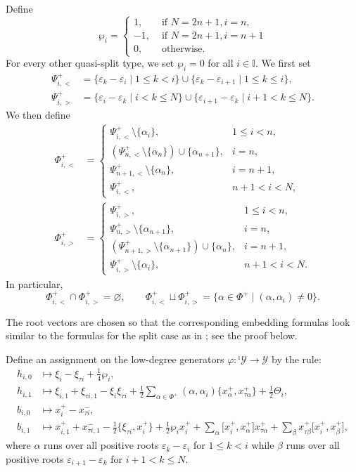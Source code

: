 \documentclass[11pt,reqno]{amsart}
\numberwithin{equation}{section}
\theoremstyle{definition}
\theoremstyle{remark}
\newcommand{\beq}{\begin{equation}}
\newcommand{\eeq}{\end{equation}}
\newcommand{\be}{\begin{equation*}}
\newcommand{\ee}{\end{equation*}}
\newcommand{\hf}{\tfrac12}
\newcommand{\lle}{\leqslant}
\newcommand{\I}{{\mathbb I}}
\newcommand{\ve}{\varepsilon}
\newcommand{\Y}{{\mathscr{Y}}}
\newcommand{\Yi}{{^\imath\mathscr{Y}}}
\newcommand{\comm}[2]{\bigl[#1,#2\bigr]}
\newcommand{\acomm}[2]{\bigl\{#1,#2\bigr\}}
\begin{document}
Define
\beq\label{eq:wpi-def}
\wp_i=\begin{cases}
    1,&\text{ if }N=2n+1,i=n,\\
    -1,&\text{ if }N=2n+1,i=n+1\\
    0,&\text{ otherwise.}
\end{cases}
\eeq
For every other quasi-split type, we set $\wp_i=0$ for all $i\in \I$.
We first set
\[
\begin{split}
\Psi^+_{i,<}&=\{\ve_k-\ve_i\mid 1\lle k<i\}
\cup \{\ve_k-\ve_{i+1}\mid 1\lle k\lle i\},\\
\Psi^+_{i,>}&=\{\ve_i-\ve_k\mid i<k\lle N\}
\cup \{\ve_{i+1}-\ve_k\mid i+1<k\lle N\}.
\end{split}
\]
We then define
\be
\begin{aligned}
\Phi^+_{i,<}&=\begin{cases}
\Psi^+_{i,<}\setminus\{\alpha_i\},&1\lle i<n,\\
(\Psi^+_{n,<}\setminus\{\alpha_n\})\cup\{\alpha_{n+1}\},&i=n,\\
\Psi^+_{n+1,<}\setminus\{\alpha_n\},&i=n+1,\\
\Psi^+_{i,<},&n+1<i<N,
\end{cases}\\[1ex]
\Phi^+_{i,>}&=\begin{cases}
\Psi^+_{i,>},&1\lle i<n,\\
\Psi^+_{n,>}\setminus\{\alpha_{n+1}\},&i=n,\\
(\Psi^+_{n+1,>}\setminus\{\alpha_{n+1}\})\cup\{\alpha_n\},&i=n+1,\\
\Psi^+_{i,>}\setminus\{\alpha_i\},&n+1<i<N.
\end{cases}
\end{aligned}
\ee
In particular,
\[
\Phi^+_{i,<}\cap\Phi^+_{i,>}=\varnothing,
\qquad
\Phi^+_{i,<}\sqcup\Phi^+_{i,>}
=\{\alpha\in\Phi^+\mid (\alpha,\alpha_i)\ne0\}.
\]


The root vectors are chosen so that the corresponding embedding formulas look similar to the formulas for the split case as in \cite{Lu26min}; see the proof below.

Define an assignment on the low-degree generators $\varphi:\Yi\to \Y$ by the rule:
\begin{align}
	h_{i,0}&\mapsto \xi_{i}-\xi_{\tau i}+\tfrac14\wp_i,\label{hi0-embedding2}\\
    h_{i,1}&\mapsto \xi_{i,1}+\xi_{\tau i,1}-\xi_{i}\xi_{\tau i}+\hf\sum_{\alpha\in\Phi^+}(\alpha,\alpha_i)\{x_\alpha^+,x_{\tau \alpha}^+\}+\hf\Theta_i,\label{hi1-embedding2}\\
    b_{i,0}&\mapsto x_{i}^+-x_{\tau i}^-,\label{bi0-embedding2}\\
    b_{i,1}&\mapsto x_{i,1}^{+}+x_{\tau i,1}^{-}
    -\tfrac12\acomm{\xi_{\tau i}}{x_i^{+}}+\hf\wp_i x_i^+ +\sum_{\alpha }
       \comm{x_i^{+}}{x_{\alpha}^{+}}x_{\tau\alpha}^{+}
    +\sum_{\beta }
       x_{\tau\beta}^{+}\comm{x_i^{+}}{x_{\beta}^{+}},\label{bi1-embedding2}
\end{align}
where $\alpha$ runs over all positive roots $\ve_k-\ve_i$ for $1\lle k<i$ while $\beta$ runs over all positive roots $\ve_{i+1}-\ve_k$ for $i+1<k\lle N$. 
\end{document}
